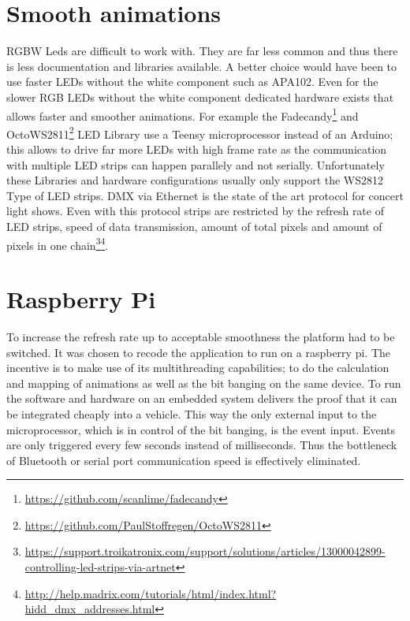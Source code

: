 \section{Smooth animations}
RGBW Leds are difficult to work with. They are far less common and thus there is less documentation and libraries available. A better choice would have been to use faster LEDs without the white component such as APA102. Even for the slower RGB LEDs without the white component dedicated hardware exists that allows faster and smoother animations. For example the Fadecandy\footnote{\url{https://github.com/scanlime/fadecandy}} and OctoWS2811\footnote{\url{https://github.com/PaulStoffregen/OctoWS2811}} LED Library use a Teensy microprocessor instead of an Arduino; this allows to drive far more LEDs with high frame rate as the communication with multiple LED strips can happen parallely and not serially. Unfortunately these Libraries and hardware configurations usually only support the WS2812 Type of LED strips. DMX via Ethernet is the state of the art protocol for concert light shows. Even with this protocol strips are restricted by the refresh rate of LED strips, speed of data transmission, amount of total pixels and amount of pixels in one chain\footnote{\url{https://support.troikatronix.com/support/solutions/articles/13000042899-controlling-led-strips-via-artnet}}\fnsep\footnote{\url{http://help.madrix.com/tutorials/html/index.html?hidd_dmx_addresses.html}}.  

\section{Raspberry Pi}
To increase the refresh rate up to acceptable smoothness the platform had to be switched. It was chosen to recode the application to run on a raspberry pi. The incentive is to make use of its multithreading capabilities; to do the calculation and mapping of animations as well as the bit banging on the same device. To run the software and hardware on an embedded system delivers the proof that it can be integrated cheaply into a vehicle. This way the only external input to the microprocessor, which is in control of the bit banging, is the event input. Events are only triggered every few seconds instead of milliseconds. Thus the bottleneck of Bluetooth or serial port communication speed is effectively eliminated. 

